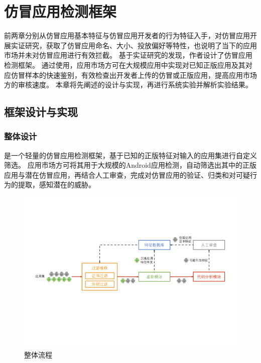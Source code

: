 \chapter{仿冒应用检测框架\mytool}
\label{chp:framework_prototype}

前两章分别从仿冒应用基本特征与仿冒应用开发者的行为特征入手，对仿冒应用开展实证研究，获取了仿冒应用命名、大小、投放偏好等特性，也说明了当下的应用市场并未对仿冒应用进行有效拦截。
基于实证研究的发现，作者设计了仿冒应用检测框架\mytool 。
通过使用\mytool ，应用市场方可在大规模应用中实现对已知正版应用及其对应仿冒样本的快速鉴别，有效检查出开发者上传的仿冒或正版应用，提高应用市场方的审核速度。
本章将先阐述\mytool 的设计与实现，再进行系统实验并解析实验结果。

\section{框架设计与实现}

\subsection{整体设计}
\mytool 是一个轻量的仿冒应用检测框架，基于已知的正版特征对输入的应用集进行自定义筛选。
应用市场方可将其用于大规模的Android应用检测，自动筛选出其中的正版应用与潜在仿冒应用，再结合人工审查，完成对仿冒应用的验证、归类和对可疑行为的提取，感知潜在的威胁。

\begin{figure}[htbp]
    \centering
    \includegraphics[width=\textwidth]{./Figures/edwin-fakerevealer-detector}
    \caption{\mytool 整体流程}
    \label{fig:Workflow_detector}
    \vspace{-3mm}
\end{figure}

